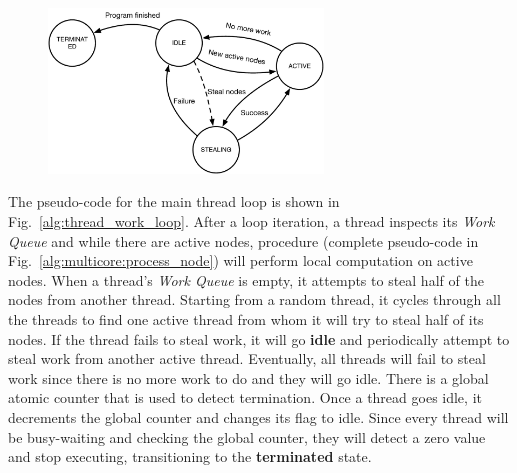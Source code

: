 \begin{figure}[ht]
   \centering
   \includegraphics[width=0.65\textwidth]{figures/implementation/thread_states.pdf}
   \label{fig:implementation:thread_states}
\end{figure}

The pseudo-code for the main thread loop is shown in
Fig.~\ref{alg:thread_work_loop}. After a loop iteration, a thread inspects its
\emph{Work Queue} and while there are active nodes, procedure
 (complete pseudo-code in
Fig.~\ref{alg:multicore:process_node}) will perform local computation on active
nodes. When a thread's \emph{Work Queue} is empty, it attempts to steal half of
the nodes from another thread. Starting from a random thread, it cycles through
all the threads to find one active thread from whom it will try to steal half of
its nodes. If the thread fails to steal work, it will go \textbf{idle} and
periodically attempt to steal work from another active thread. Eventually, all
threads will fail to steal work since there is no more work to do and they will
go idle.  There is a global atomic counter that is used to detect termination.
Once a thread goes idle, it decrements the global counter and changes its flag
to idle.  Since every thread will be busy-waiting and checking the global
counter, they will detect a zero value and stop executing, transitioning to the
\textbf{terminated} state.


